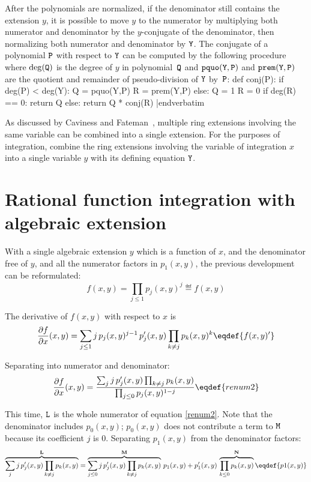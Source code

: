 After the polynomials are normalized, if the denominator still
contains the extension $y$, it is possible to move $y$ to the
numerator by multiplying both numerator and denominator by the
$y$-conjugate of the denominator, then normalizing both numerator and
denominator by ${\tt{Y}}$.  The conjugate of a polynomial ${\tt{P}}$
with respect to ${\tt{Y}}$ can be computed by the following procedure
where $\deg({\tt{Q}})$ is the degree of $y$ in polynomial~${\tt{Q}}$ and
${\tt{pquo(Y,P)}}$ and ${\tt{prem(Y,P)}}$ are the quotient and
remainder of pseudo-division of ${\tt{Y}}$ by~${\tt{P}}$:
\medskip
\verbatim
def conj(P):
    if deg(P) < deg(Y):
        Q = pquo(Y,P)
        R = prem(Y,P)
    else:
        Q = 1
        R = 0
    if deg(R) == 0:
        return Q
    else:
        return Q * conj(R)
|endverbatim
\medskip

As discussed by Caviness and
Fateman~\cite{Caviness:1976:SRE:800205.806352}, multiple ring
extensions involving the same variable can be combined into a single
extension.  For the purposes of integration, combine the ring
extensions involving the variable of integration $x$ into a single
variable $y$ with its defining equation ${\tt{Y}}$.

\section{Rational function integration with algebraic extension}

With a single algebraic extension $y$ which is a function of
$x$, and the denominator free of $y$, and all the numerator factors in
$p_1(x,y)$, the previous development can be reformulated:
$$f(x,y)=\prod_{j\le1}p_j(x,y)^j\eqdef{f(x,y)}$$

The derivative of $f(x,y)$ with respect to $x$ is
$${\partial{f}\over \partial{x}}(x,y)=\sum_{j\le1}j\,p_j(x,y)^{j-1}\,{p_j'}(x,y)\prod_{k\neq j}p_k(x,y)^k
  \eqdef{f(x,y)'}$$

Separating into numerator and denominator:
$${\partial{f}\over \partial{x}}(x,y)
 ={\sum_{j}j\,{p_j'}(x,y)\prod_{k\neq j}p_k(x,y)
 \over\prod_{j\le0}p_j(x,y)^{1-j}}
\eqdef{renum2}$$

This time, ${\tt{L}}$ is the whole numerator of
equation \eqref{renum2}.  Note that the denominator includes
$p_0(x,y)$; $p_0(x,y)$ does not contribute a term to ${\tt{M}}$
because its coefficient $j$ is 0.  Separating $p_1(x,y)$ from the
denominator factors:
$$\overbrace{\sum_{j}j\,{p_j'}(x,y)\prod_{k\neq j} p_k(x,y)}^{\bf L}=
  \overbrace{\sum_{j\le0}j\,{p_j'}(x,y)\prod_{k\neq j}p_k(x,y)}^{{\bf M}}\,p_1(x,y)
  +{p_1'}(x,y)\,\overbrace{\prod_{k\le0}p_k(x,y)}^{{\bf N}}\eqdef{p1(x,y)}$$

